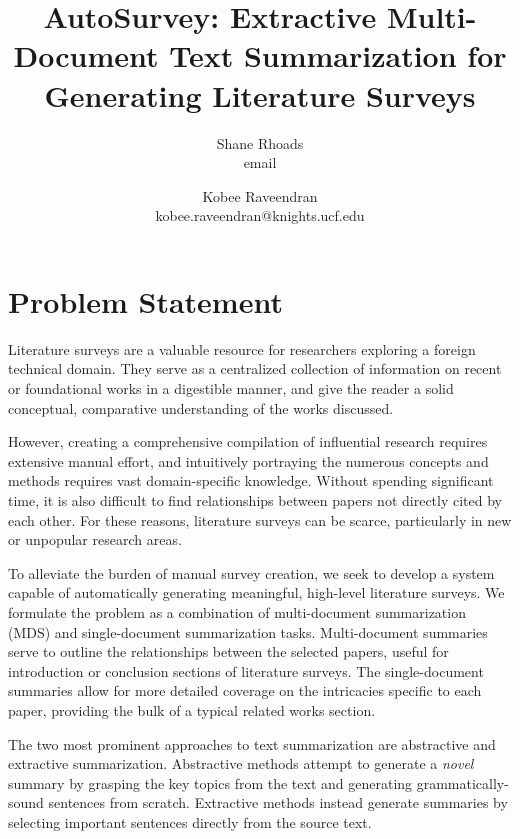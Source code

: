 \documentclass[conference]{sig-alternate-05-2015}
\begin{document}
\title{AutoSurvey: Extractive Multi-Document Text Summarization for Generating Literature Surveys}


\author{Shane Rhoads\\ email \and Kobee Raveendran  \\ kobee.raveendran@knights.ucf.edu}

\maketitle

\section{Problem Statement}

Literature surveys are a valuable resource for researchers exploring a foreign technical domain. They serve as a 
centralized collection of information on recent or foundational works in a digestible manner, and give the reader 
a solid conceptual, comparative understanding of the works discussed. 

However, creating a comprehensive compilation of influential research requires extensive manual effort, and intuitively 
portraying the numerous concepts and methods requires vast domain-specific knowledge. Without spending significant 
time, it is also difficult to find relationships between papers not directly cited by each other. For these reasons, literature 
surveys can be scarce, particularly in new or unpopular research areas.

To alleviate the burden of manual survey creation, we seek to develop a system capable of automatically generating meaningful, 
high-level literature surveys. We formulate the problem as a combination of multi-document summarization (MDS) and 
single-document summarization tasks. Multi-document summaries serve to outline the relationships between the selected papers, 
useful for introduction or conclusion sections of literature surveys. The single-document summaries allow for more detailed 
coverage on the intricacies specific to each paper, providing the bulk of a typical related works section.

The two most prominent approaches to text summarization are abstractive and extractive summarization. Abstractive methods attempt to generate a 
\textit{novel} summary by grasping the key topics from the text and generating grammatically-sound sentences from scratch. 
Extractive methods instead generate summaries by selecting important sentences directly from the source text. 
\end{document}
